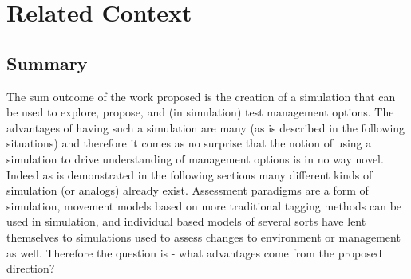 \documentclass[11pt]{article}
\begin{document}
\newpage















\section{Related Context}

\subsection{Summary}

The sum outcome of the work proposed is the creation of a simulation that can be used to explore, propose, and (in simulation) test management options. The advantages of having such a simulation are many (as is described in the following situations) and therefore it comes as no surprise that the notion of using a simulation to drive understanding of management options is in no way novel. Indeed as is demonstrated in the following sections many different kinds of simulation (or analogs) already exist. Assessment paradigms are a form of simulation, movement models based on more traditional tagging methods can be used in simulation, and individual based models of several sorts have lent themselves to simulations used to assess changes to environment or management as well. Therefore the question is - what advantages come from the proposed direction? 
\end{document}
